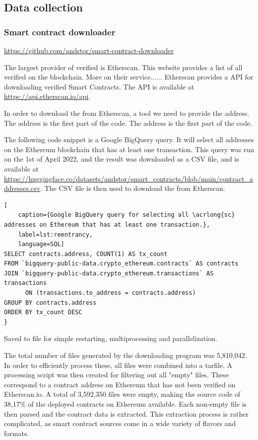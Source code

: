 \subsection{Data collection}
\label{sec:data-collection}

\subsubsection{Smart contract downloader}
\label{sec:smart-contract-downloader}
\url{https://github.com/andstor/smart-contract-downloader}


The largest provider of verified  is Etherscan. This website provides a list of all verified  on the blockchain. More on their service...... Etherscan provides a API for downloading verified Smart Contracts. The API is available at \url{https://api.etherscan.io/api}.

In order to download the  from Etherscan, a tool we need to provide the  address. The address is the first part of the  code. The address is the first part of the  code.

The following code snippet is a Google BigQuery query. It will select all  addresses on the Ethereum blockchain that has at least one transaction. This query was run on the 1st of April 2022, and the result was downloaded as a CSV file, and is available at \url{https://huggingface.co/datasets/andstor/smart_contracts/blob/main/contract_addresses.csv}. The CSV file is then used to download the  from Etherscan.

\begin{lstlisting}[
    caption={Google BigQuery query for selecting all \acrlong{sc} addresses on Ethereum that has at least one transaction.},
    label=lst:reentrancy,
    language=SQL]
SELECT contracts.address, COUNT(1) AS tx_count
FROM `bigquery-public-data.crypto_ethereum.contracts` AS contracts
JOIN `bigquery-public-data.crypto_ethereum.transactions` AS transactions 
      ON (transactions.to_address = contracts.address)
GROUP BY contracts.address
ORDER BY tx_count DESC
}
\end{lstlisting}

Saved to file for simple restarting, multiprocessing and parallelization.

The total number of files generated by the downloading program was 5,810,042. In order to efficiently process these, all files were combined into a tarfile. A processing script was then created for filtering out all "empty" files. These correspond to a contract address on Ethereum that has not been verified on Etherscan.io. A total of 3,592,350 files were empty, making the source code of 38,17\% of the deployed contracts on Ethereum available. Each non-empty file is then parsed and the contract data is extracted. This extraction process is rather complicated, as smart contract sources come in a wide variety of flavors and formats.

